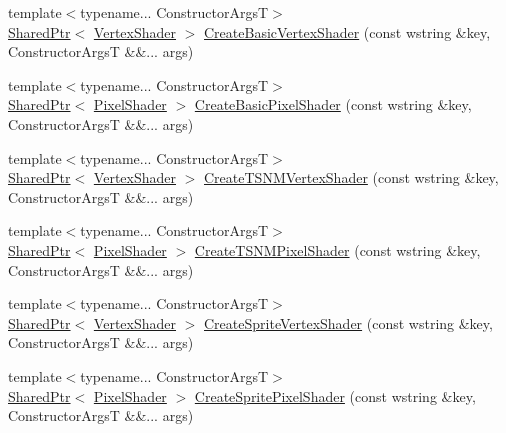 \begin{DoxyCompactItemize}
\item 
{\footnotesize template$<$typename... Constructor\+ArgsT$>$ }\\\hyperlink{namespacemage_a1e01ae66713838a7a67d30e44c67703e}{Shared\+Ptr}$<$ \hyperlink{classmage_1_1_vertex_shader}{Vertex\+Shader} $>$ \hyperlink{classmage_1_1_resource_factory_a4f2edcce081674e130a98491dd06b5a4}{Create\+Basic\+Vertex\+Shader} (const wstring \&key, Constructor\+ArgsT \&\&... args)
\item 
{\footnotesize template$<$typename... Constructor\+ArgsT$>$ }\\\hyperlink{namespacemage_a1e01ae66713838a7a67d30e44c67703e}{Shared\+Ptr}$<$ \hyperlink{classmage_1_1_pixel_shader}{Pixel\+Shader} $>$ \hyperlink{classmage_1_1_resource_factory_acbc6709548be423229f3bc8df11d0746}{Create\+Basic\+Pixel\+Shader} (const wstring \&key, Constructor\+ArgsT \&\&... args)
\item 
{\footnotesize template$<$typename... Constructor\+ArgsT$>$ }\\\hyperlink{namespacemage_a1e01ae66713838a7a67d30e44c67703e}{Shared\+Ptr}$<$ \hyperlink{classmage_1_1_vertex_shader}{Vertex\+Shader} $>$ \hyperlink{classmage_1_1_resource_factory_a5152f77ed84f45b4417f50e51c22529a}{Create\+T\+S\+N\+M\+Vertex\+Shader} (const wstring \&key, Constructor\+ArgsT \&\&... args)
\item 
{\footnotesize template$<$typename... Constructor\+ArgsT$>$ }\\\hyperlink{namespacemage_a1e01ae66713838a7a67d30e44c67703e}{Shared\+Ptr}$<$ \hyperlink{classmage_1_1_pixel_shader}{Pixel\+Shader} $>$ \hyperlink{classmage_1_1_resource_factory_a74a90d9fb3d2fa7c019f44829673de25}{Create\+T\+S\+N\+M\+Pixel\+Shader} (const wstring \&key, Constructor\+ArgsT \&\&... args)
\item 
{\footnotesize template$<$typename... Constructor\+ArgsT$>$ }\\\hyperlink{namespacemage_a1e01ae66713838a7a67d30e44c67703e}{Shared\+Ptr}$<$ \hyperlink{classmage_1_1_vertex_shader}{Vertex\+Shader} $>$ \hyperlink{classmage_1_1_resource_factory_a5c715052aedb7c7cd7c21801fb97e3e2}{Create\+Sprite\+Vertex\+Shader} (const wstring \&key, Constructor\+ArgsT \&\&... args)
\item 
{\footnotesize template$<$typename... Constructor\+ArgsT$>$ }\\\hyperlink{namespacemage_a1e01ae66713838a7a67d30e44c67703e}{Shared\+Ptr}$<$ \hyperlink{classmage_1_1_pixel_shader}{Pixel\+Shader} $>$ \hyperlink{classmage_1_1_resource_factory_a91251025ddb5d78c95a0a2dde0a3bd7c}{Create\+Sprite\+Pixel\+Shader} (const wstring \&key, Constructor\+ArgsT \&\&... args)

\end{DoxyCompactItemize}
